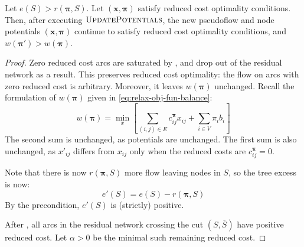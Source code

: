 \begin{lemma} \label{lemma:relax-correctness-updatepotentials}
Let $e(S) > r(\boldsymbol{\pi},S)$. Let $\left(\mathbf{x},\boldsymbol{\pi}\right)$ satisfy reduced cost optimality conditions. Then, after executing $\textproc{UpdatePotentials}$, the new pseudoflow and node potentials $\left(\mathbf{x},\boldsymbol{\pi}\right)$ continue to satisfy reduced cost optimality conditions, and $w(\boldsymbol{\pi}') > w(\boldsymbol{\pi})$.
\end{lemma}
\begin{proof}
Zero reduced cost arcs are saturated by , and drop out of the residual network as a result. This preserves reduced cost optimality: the flow on arcs with zero reduced cost is arbitrary. Moreover, it leaves $w(\boldsymbol{\pi})$ unchanged. Recall the formulation of $w(\boldsymbol{\pi})$ given in \cref{eq:relax-obj-fun-balance}:
\[w(\boldsymbol{\pi})=\min_{x}\left[\sum_{\left(i,j\right)\in E}c_{ij}^{\boldsymbol{\pi}}x_{ij}+\sum_{i\in V}\pi_{i}b_{i}\right]\]
The second sum is unchanged, as potentials are unchanged. The first sum is also unchanged, as $x'_{ij}$ differs from $x_{ij}$ only when the reduced costs are $c_{ij}^{\boldsymbol{\pi}}=0$.

Note that there is now $r(\boldsymbol{\pi},S)$ more flow leaving nodes in $S$, so the tree excess is now:
\[e'(S) = e(S) - r(\boldsymbol{\pi},S)\]
By the precondition, $e'(S)$ is (strictly) positive.

After , all arcs in the residual network crossing the cut $\left(S,\overline{S}\right)$ have positive reduced cost\footnotemark. Let $\alpha > 0$ be the minimal such remaining reduced cost.


\end{proof}
